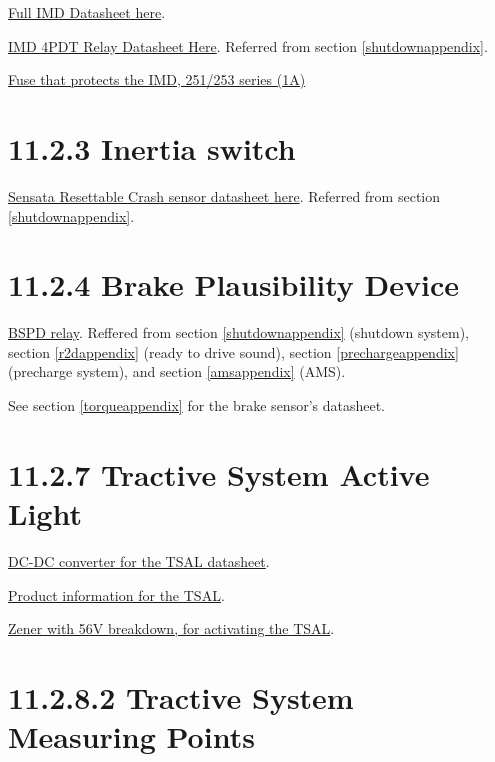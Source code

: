 \documentclass{article}
\begin{document}
\href{http://www.bender.org/documents/IR155-10_datasheet_NAE1012821.pdf}{Full IMD Datasheet here}.

\href{http://www.automationdirect.com/static/specs/78relays.pdf}{IMD 4PDT Relay Datasheet Here}. Referred from section \ref{shutdownappendix}.

\href{http://www.littelfuse.com/~/media/electronics/datasheets/fuses/littelfuse_fuse_251_253_datasheet.pdf.pdf}{Fuse that protects the IMD, 251/253 series (1A)}

\section*{11.2.3 Inertia switch} \label{inertiaappendix}

\href{http://www.sensata.com/download/resettable-crash.pdf}{Sensata Resettable Crash sensor datasheet here}. Referred from section \ref{shutdownappendix}.

\section*{11.2.4 Brake Plausibility Device} \label{bspdappendix}

\href{http://www.te.com/commerce/DocumentDelivery/DDEController?Action=srchrtrv&DocNm=PB&DocType=DS&DocLang=English}{BSPD relay}. Reffered from section \ref{shutdownappendix} (shutdown system), section \ref{r2dappendix} (ready to drive sound), section \ref{prechargeappendix} (precharge system), and section \ref{amsappendix} (AMS).

See section \ref{torqueappendix} for the brake sensor's datasheet.

\section*{11.2.7 Tractive System Active Light}

\href{http://www.mouser.com/ds/2/281/mdc_ruw15-217876.pdf}{DC-DC converter for the TSAL datasheet}.

\href{https://www.superbrightleds.com/moreinfo/oval-marker-lamps/oval-led-truck-trailer-light-with-reflectorized-lens-4in-led-marker-clearance-light-with-4-leds/580/#/tab/Specifications}{Product information for the TSAL}.

\href{http://www.onsemi.com/pub_link/Collateral/1N5333B-D.PDF}{Zener with 56V breakdown, for activating the TSAL}.

\section*{11.2.8.2 Tractive System Measuring Points} \label{tsmpappendix}
\end{document}
